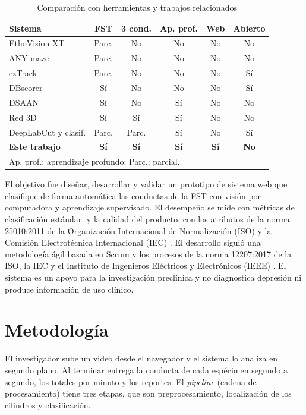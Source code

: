 \documentclass[conference,letterpaper]{IEEEtran}
\begin{document}
\begin{table}[t]
\renewcommand{\arraystretch}{1.15}
\setlength{\tabcolsep}{3pt}
\caption{Comparación con herramientas y trabajos relacionados}
\label{tab:comparacion}
\centering
\footnotesize
\begin{tabular}{|l|c|c|c|c|c|}
\hline
\textbf{Sistema} & \textbf{FST} & \textbf{3 cond.} & \textbf{Ap. prof.} & \textbf{Web} & \textbf{Abierto} \\
\hline
EthoVision XT & Parc. & No & No & No & No \\
\hline
ANY-maze & Parc. & No & No & No & No \\
\hline
ezTrack & Parc. & No & No & No & Sí \\
\hline
DBscorer & Sí & No & No & No & Sí \\
\hline
DSAAN & Sí & No & Sí & No & No \\
\hline
Red 3D \cite{dellavalle} & Sí & Sí & Sí & No & No \\
\hline
DeepLabCut y clasif. & Parc. & Parc. & Sí & No & Sí \\
\hline
\textbf{Este trabajo} & \textbf{Sí} & \textbf{Sí} & \textbf{Sí} & \textbf{Sí} & \textbf{No} \\
\hline
\multicolumn{6}{l}{Ap. prof.: aprendizaje profundo; Parc.: parcial.}
\end{tabular}
\end{table}

El objetivo fue diseñar, desarrollar y validar un prototipo de sistema web que clasifique de
forma automática las conductas de la FST con visión por computadora y aprendizaje
supervisado. El desempeño se mide con métricas de clasificación estándar, y la calidad del
producto, con los atributos de la norma 25010:2011 de la Organización Internacional de
Normalización (ISO) y la Comisión Electrotécnica Internacional (IEC) \cite{iso25010}. El
desarrollo siguió una metodología ágil basada en Scrum y los procesos de la norma
12207:2017 de la ISO, la IEC y el Instituto de Ingenieros Eléctricos y Electrónicos (IEEE)
\cite{iso12207}. El sistema es un apoyo para la investigación preclínica y no diagnostica
depresión ni produce información de uso clínico.

\section{Metodología}

El investigador sube un video desde el navegador y el sistema lo analiza en segundo plano.
Al terminar entrega la conducta de cada espécimen segundo a segundo, los totales por minuto
y los reportes. El \textit{pipeline} (cadena de procesamiento) tiene tres etapas, que son
preprocesamiento, localización de los cilindros y clasificación.
\end{document}
